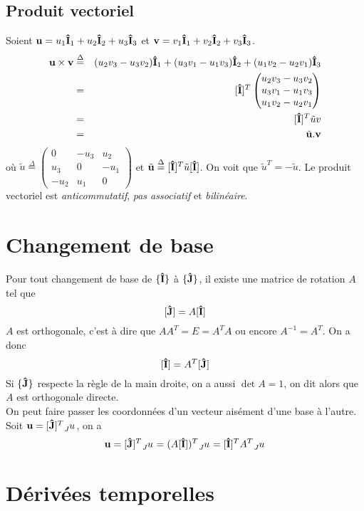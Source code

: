 \documentclass[11pt,a4paper]{article} %
\newcommand\fv[1]{{\bf #1}} %
\newcommand\ui{{\bf\hat{I}}} %
\newcommand\uj{{\bf\hat{J}}} %
\newcommand\eqdef{\stackrel{\Delta}{=}}
\newcommand\wrt[2]{\tensor*[_{ #1}]{ #2}{}} %
\begin{document}
\subsection{Produit vectoriel}

Soient $\fv{u} = u_1\ui_1 + u_2\ui_2 + u_3\ui_3$ et $\fv{v} = v_1\ui_1 + v_2\ui_2 + v_3\ui_3$.
\begin{eqnarray*}
	\fv{u}\times\fv{v} & \eqdef & (u_2v_3 - u_3v_2) \ui_1 + (u_3v_1 - u_1v_3) \ui_2 + (u_1v_2 - u_2v_1) \ui_3\\
	& = & [\ui]^T \begin{pmatrix}u_2v_3 - u_3v_2 \\ u_3v_1 - u_1v_3 \\ u_1v_2 - u_2v_1\end{pmatrix}\\
	& = & [\ui]^T \tilde{u}v\\
	& = & \tilde{\fv{u}}.\fv{v}
\end{eqnarray*}
où $\tilde{u} \eqdef \begin{pmatrix}0 & -u_3 & u_2\\ u_3 & 0 & -u_1\\ -u_2 & u_1 & 0\end{pmatrix}$
	et $\tilde{\fv{u}} \eqdef [\ui]^T \tilde{u} [\ui]$. On voit que $\tilde{u}^T = -\tilde{u}$.
Le produit vectoriel est {\em anticommutatif}, {\em pas associatif} et {\em bilinéaire}.

\section{Changement de base}

Pour tout changement de base de $\{\ui\}$ à $\{\uj\}$, il existe une matrice de rotation $A$ tel que
\[ [\uj] = A [\ui] \]
$A$ est orthogonale, c'est à dire que $AA^T = E = A^TA$ ou encore $A^{-1} = A^T$. On a donc
\[ [\ui] = A^T [\uj] \]
Si $\{\uj\}$ respecte la règle de la main droite, on a aussi $\det A = 1$, on dit alors que $A$ est orthogonale directe.\\
On peut faire passer les coordonnées d'un vecteur aisément d'une base à l'autre. Soit $\fv{u} = [\uj]^T \wrt{J}{u}$, on a
\[ \fv{u} = [\uj]^T \wrt{J}{u} = (A[\ui])^T \wrt{J}{u} = [\ui]^TA^T \wrt{J}{u} \]

\section{Dérivées temporelles}
\end{document}

